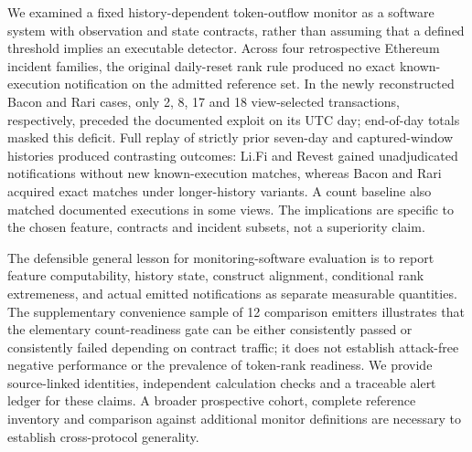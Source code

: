 \documentclass[preprint,12pt,authoryear]{elsarticle}
\begin{document}
We examined a fixed history-dependent token-outflow monitor as a software system with observation and state contracts, rather than assuming that a defined threshold implies an executable detector. Across four retrospective Ethereum incident families, the original daily-reset rank rule produced no exact known-execution notification on the admitted reference set. In the newly reconstructed Bacon and Rari cases, only 2, 8, 17 and 18 view-selected transactions, respectively, preceded the documented exploit on its UTC day; end-of-day totals masked this deficit. Full replay of strictly prior seven-day and captured-window histories produced contrasting outcomes: Li.Fi and Revest gained unadjudicated notifications without new known-execution matches, whereas Bacon and Rari acquired exact matches under longer-history variants. A count baseline also matched documented executions in some views. The implications are specific to the chosen feature, contracts and incident subsets, not a superiority claim.

The defensible general lesson for monitoring-software evaluation is to report feature computability, history state, construct alignment, conditional rank extremeness, and actual emitted notifications as separate measurable quantities. The supplementary convenience sample of 12 comparison emitters illustrates that the elementary count-readiness gate can be either consistently passed or consistently failed depending on contract traffic; it does not establish attack-free negative performance or the prevalence of token-rank readiness. We provide source-linked identities, independent calculation checks and a traceable alert ledger for these claims. A broader prospective cohort, complete reference inventory and comparison against additional monitor definitions are necessary to establish cross-protocol generality.
\end{document}
